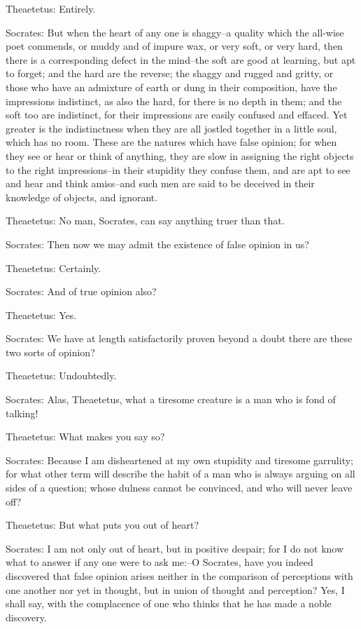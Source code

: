 Theaetetus: Entirely.

Socrates: But when the heart of any one is shaggy--a quality which the
all-wise poet commends, or muddy and of impure wax, or very soft, or
very hard, then there is a corresponding defect in the mind--the soft
are good at learning, but apt to forget; and the hard are the reverse;
the shaggy and rugged and gritty, or those who have an admixture of
earth or dung in their composition, have the impressions indistinct,
as also the hard, for there is no depth in them; and the soft too are
indistinct, for their impressions are easily confused and effaced. Yet
greater is the indistinctness when they are all jostled together in a
little soul, which has no room. These are the natures which have false
opinion; for when they see or hear or think of anything, they are
slow in assigning the right objects to the right impressions--in their
stupidity they confuse them, and are apt to see and hear and think
amiss--and such men are said to be deceived in their knowledge of
objects, and ignorant.

Theaetetus: No man, Socrates, can say anything truer than that.

Socrates: Then now we may admit the existence of false opinion in us?

Theaetetus: Certainly.

Socrates: And of true opinion also?

Theaetetus: Yes.

Socrates: We have at length satisfactorily proven beyond a doubt there
are these two sorts of opinion?

Theaetetus: Undoubtedly.

Socrates: Alas, Theaetetus, what a tiresome creature is a man who is
fond of talking!

Theaetetus: What makes you say so?

Socrates: Because I am disheartened at my own stupidity and tiresome
garrulity; for what other term will describe the habit of a man who
is always arguing on all sides of a question; whose dulness cannot be
convinced, and who will never leave off?

Theaetetus: But what puts you out of heart?

Socrates: I am not only out of heart, but in positive despair; for I do
not know what to answer if any one were to ask me:--O Socrates, have you
indeed discovered that false opinion arises neither in the comparison of
perceptions with one another nor yet in thought, but in union of thought
and perception? Yes, I shall say, with the complacence of one who thinks
that he has made a noble discovery.

